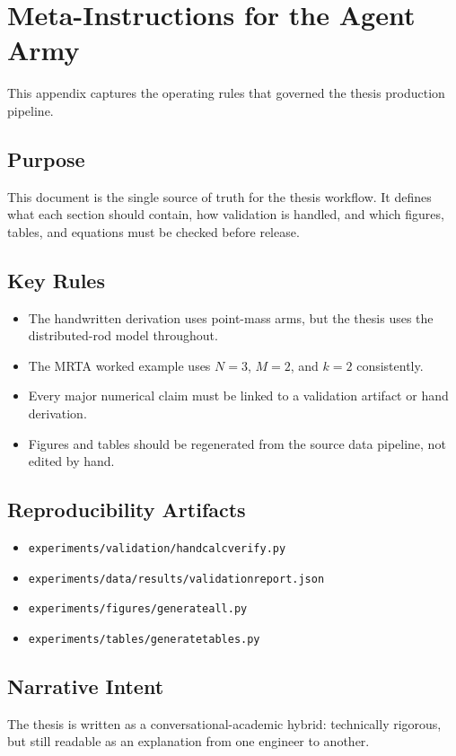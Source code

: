 \chapter{Meta-Instructions for the Agent Army}
\label{app:meta-instructions}

This appendix captures the operating rules that governed the thesis production pipeline.

\section{Purpose}

This document is the single source of truth for the thesis workflow. It defines what each section should contain, how validation is handled, and which figures, tables, and equations must be checked before release.

\section{Key Rules}

\begin{itemize}
\item The handwritten derivation uses point-mass arms, but the thesis uses the distributed-rod model throughout.
\item The MRTA worked example uses $N=3$, $M=2$, and $k=2$ consistently.
\item Every major numerical claim must be linked to a validation artifact or hand derivation.
\item Figures and tables should be regenerated from the source data pipeline, not edited by hand.
\end{itemize}

\section{Reproducibility Artifacts}

\begin{itemize}
\item \texttt{experiments/validation/hand\textunderscore calc\textunderscore verify.py}
\item \texttt{experiments/data/results/validation\textunderscore report.json}
\item \texttt{experiments/figures/generate\textunderscore all.py}
\item \texttt{experiments/tables/generate\textunderscore tables.py}
\end{itemize}

\section{Narrative Intent}

The thesis is written as a conversational-academic hybrid: technically rigorous, but still readable as an explanation from one engineer to another.